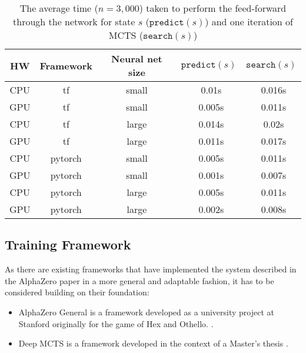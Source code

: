\begin{table*}
    \begin{center}
        \begin{tabular}{ c|c|c|c|c }
            HW  & Framework & Neural net size & $\texttt{predict}(s)$ & $\texttt{search}(s)$ \\
            \hline
            \hline
            CPU & tf        & small           & ~0.01s                & ~0.016s              \\
            GPU & tf        & small           & ~0.005s               & ~0.011s              \\
            CPU & tf        & large           & ~0.014s               & ~0.02s               \\
            GPU & tf        & large           & ~0.011s               & ~0.017s              \\
            CPU & pytorch   & small           & ~0.005s               & ~0.011s              \\
            GPU & pytorch   & small           & ~0.001s               & ~0.007s              \\
            CPU & pytorch   & large           & ~0.005s               & ~0.011s              \\
            GPU & pytorch   & large           & ~0.002s               & ~0.008s              \\
        \end{tabular}
    \end{center}
    \caption{The average time ($n = 3,000$) taken to perform the feed-forward through the network for state $s$ ($\texttt{predict}(s)$) and one iteration of MCTS ($\texttt{search}(s)$)}\label{pytorch_vs_tensorflow_performance}
\end{table*}

\subsection{Training Framework}
\label{training_framework}
As there are existing frameworks that have implemented the system described in the AlphaZero paper in a more general and adaptable fashion, it has to be considered building on their foundation:
\begin{itemize}
    \item AlphaZero General is a framework developed as a university project at Stanford originally for the game of Hex and Othello. \cite{thakoor_learning_nodate,thakoor_suragnairalpha-zero-general_nodate}.
    \item Deep MCTS is a framework developed in the context of a Master's thesis \cite{bruasdal_deep_2020,henribru_deep_2021}.
\end{itemize}

